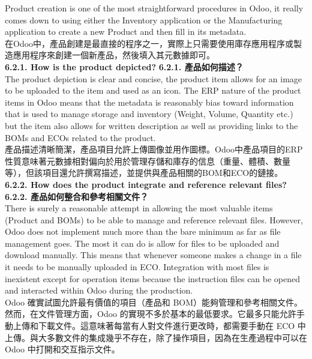 \documentclass[12pt,a4paper]{report}  %
\begin{document}
Product creation is one of the most straightforward procedures in Odoo, it really comes 
down to using either the Inventory application or the Manufacturing application to create a 
new Product and then fill in its metadata.\\
在Odoo中，產品創建是最直接的程序之一，實際上只需要使用庫存應用程序或製造應用程序來創建一個新產品，然後填入其元數據即可。\\

\Large\textbf{6.2.1. How is the product depicted?}
\Large\textbf{6.2.1. 產品如何描述？}\\

The product depiction is clear and concise, the product item allows for an image to be 
uploaded to the item and used as an icon. The ERP nature of the product items in Odoo means 
that the metadata is reasonably bias toward information that is used to manage storage and 
inventory (Weight, Volume, Quantity etc.) but the item also allows for written description 
as well as providing links to the BOMs and ECOs related to the product.\\
產品描述清晰簡潔，產品項目允許上傳圖像並用作圖標。Odoo中產品項目的ERP性質意味著元數據相對偏向於用於管理存儲和庫存的信息（重量、體積、數量等），但該項目還允許撰寫描述，並提供與產品相關的BOM和ECO的鏈接。\\

\Large\textbf{6.2.2. How does the product integrate and reference relevant files?}\\
\Large\textbf{6.2.2. 產品如何整合和參考相關文件？}\\

There is surely a reasonable attempt in allowing the most valuable items (Product and 
BOMs) to be able to manage and reference relevant files. However, Odoo does not implement 
much more than the bare minimum as far as file management goes. The most it can do is 
allow for files to be uploaded and download manually. This means that whenever someone 
makes a change in a file it needs to be manually uploaded in ECO. Integration with most files 
is inexistent except for operation items because the instruction files can be opened and 
interacted within Odoo during the production.\\
Odoo 確實試圖允許最有價值的項目（產品和 BOM）能夠管理和參考相關文件。然而，在文件管理方面，Odoo 的實現不多於基本的最低要求。它最多只能允許手動上傳和下載文件。這意味著每當有人對文件進行更改時，都需要手動在 ECO 中上傳。與大多數文件的集成幾乎不存在，除了操作項目，因為在生產過程中可以在 Odoo 中打開和交互指示文件。\\
\end{document}
